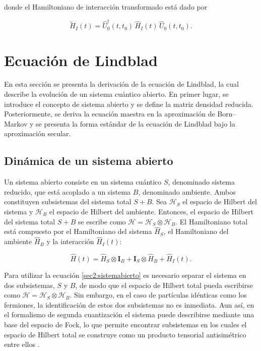 donde el Hamiltoniano de interacción transformado está dado por

\begin{equation*}
    \tilde{H}_{I}(t) = \hat{U}^{\dagger}_{0}(t,t_{0})\,\hat{H}_{I}(t)\,\hat{U}_{0}(t,t_{0}).
\end{equation*}

\label{sec:closedQM}



\section{Ecuación de Lindblad}
En esta sección se presenta la derivación de la ecuación de Lindblad, la cual describe la evolución de un sistema cuántico abierto. En primer lugar, se introduce el concepto de sistema abierto y se define la matriz densidad reducida. Posteriormente, se deriva la ecuación maestra en la aproximación de Born--Markov y se presenta la forma estándar de la ecuación de Lindblad bajo la aproximación secular.

\label{SEClindblad}
\subsection{Dinámica de un sistema abierto}

Un sistema abierto consiste en un sistema cuántico $S$, denominado sistema reducido, que está acoplado a un sistema $B$, denominado ambiente. Ambos constituyen subsistemas del sistema total $S+B$. Sea $\mathcal{H}_{S}$ el espacio de Hilbert del sistema y $\mathcal{H}_{B}$ el espacio de Hilbert del ambiente. Entonces, el espacio de Hilbert del sistema total $S+B$ se escribe como $\mathcal{H} = \mathcal{H}_{S} \otimes \mathcal{H}_{B}$. El Hamiltoniano total está compuesto por el Hamiltoniano del sistema $\hat{H}_{S}$, el Hamiltoniano del ambiente $\hat{H}_{B}$ y la interacción $\hat{H}_{I}(t)$:

\begin{equation}
    \hat{H}(t) = \hat{H}_{S} \otimes \mathbf{I}_{B} + \mathbf{I}_{S} \otimes \hat{H}_{B} + \hat{H}_{I}(t).
    \label{sec2:sistemabierto}
\end{equation}

Para utilizar la ecuación \eqref{sec2:sistemabierto} es necesario separar el sistema en dos subsistemas, $S$ y $B$, de modo que el espacio de Hilbert total pueda escribirse como $\mathcal{H} = \mathcal{H}_{S}\otimes \mathcal{H}_{B}$. Sin embargo, en el caso de partículas idénticas como los fermiones, la identificación de estos dos subsistemas no es inmediata. Aun así, en el formalismo de segunda cuantización el sistema puede describirse mediante una base del espacio de Fock, lo que permite encontrar subsistemas en los cuales el espacio de Hilbert total se construye como un producto tensorial antisimétrico entre ellos \cite{friis2013fermionic,vidal2021quantum}.


